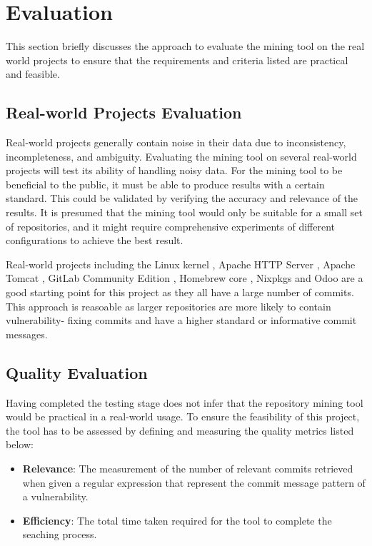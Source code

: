 \documentclass[12pt, a4paper]{report}
\begin{document}
\section{Evaluation}
This section briefly discusses the approach to evaluate the mining tool on the real world projects
to ensure that the requirements and criteria listed are practical and feasible.

\subsection{Real-world Projects Evaluation} \label{sec:realworld}
Real-world projects generally contain noise in their data due to inconsistency, incompleteness, and
ambiguity. Evaluating the mining tool on several real-world projects will test its ability of
handling noisy data. For the mining tool to be beneficial to the public, it must be able to produce
results with a certain standard. This could be validated by verifying the accuracy and relevance of
the results. It is presumed that the mining tool would only be suitable for a small set of
repositories, and it might require comprehensive experiments of different configurations to achieve
the best result.

Real-world projects including the Linux kernel \cite{linux_repo}, Apache HTTP Server
\cite{apache_httpd_repo}, Apache Tomcat \cite{apache_tomcat_repo}, GitLab Community Edition
\cite{gitlab_repo}, Homebrew core \cite{homebrew_core_repo}, Nixpkgs \cite{nix_packages_repo} and
Odoo \cite{odoo_repo} are a good starting point for this project as they all have a large number of
commits. This approach is reasoable as larger repositories are more likely to contain vulnerability-
fixing commits and have a higher standard or informative commit messages.

\subsection{Quality Evaluation}
Having completed the testing stage does not infer that the repository mining tool would be practical
in a real-world usage. To ensure the feasibility of this project, the tool has to be assessed by
defining and measuring the quality metrics listed below:

\begin{itemize}
	\item \textbf{Relevance}: The measurement of the number of relevant commits retrieved when given a
  regular expression that represent the commit message pattern of a vulnerability.
  \item \textbf{Efficiency}: The total time taken required for the tool to complete the seaching
  process.
\end{itemize}
\end{document}
